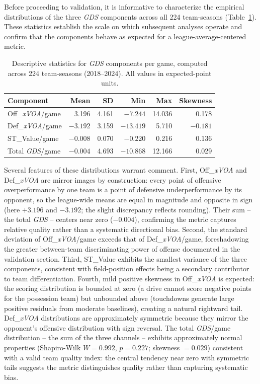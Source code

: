 \documentclass[12pt,a4paper]{article}
\newcommand{\xvoa}{\textit{xVOA}}
\newcommand{\gds}{\textit{GDS}}
\begin{document}
Before proceeding to validation, it is informative to characterize the empirical distributions of the three \gds{} components across all 224 team-seasons (Table~\ref{tab:descriptives}). These statistics establish the scale on which subsequent analyses operate and confirm that the components behave as expected for a league-average-centered metric.

\begin{table}[htbp]
  \centering
  \caption{Descriptive statistics for \gds{} components per game, computed across 224 team-seasons (2018--2024). All values in expected-point units.}
  \label{tab:descriptives}
  \small
  \begin{tabular}{lrrrrr}
    \toprule
    \textbf{Component} & \textbf{Mean} & \textbf{SD} & \textbf{Min} & \textbf{Max} & \textbf{Skewness} \\
    \midrule
    Off\_\xvoa{}/game  & 3.196 & 4.161 & $-7.244$ & 14.036 & 0.178 \\
    Def\_\xvoa{}/game  & $-3.192$ & 3.159 & $-13.419$ & 5.710 & $-0.181$ \\
    ST\_Value/game     & $-0.008$ & 0.070 & $-0.220$ & 0.216 & 0.136 \\
    Total \gds{}/game  & $-0.004$ & 4.693 & $-10.868$ & 12.166 & 0.029 \\
    \bottomrule
  \end{tabular}
\end{table}

Several features of these distributions warrant comment. First, Off\_\xvoa{} and Def\_\xvoa{} are mirror images by construction: every point of offensive overperformance by one team is a point of defensive underperformance by its opponent, so the league-wide means are equal in magnitude and opposite in sign (here $+3.196$ and $-3.192$; the slight discrepancy reflects rounding). Their sum -- the total \gds{} -- centers near zero ($-0.004$), confirming the metric captures relative quality rather than a systematic directional bias. Second, the standard deviation of Off\_\xvoa{}/game exceeds that of Def\_\xvoa{}/game, foreshadowing the greater between-team discriminating power of offense documented in the validation section. Third, ST\_Value exhibits the smallest variance of the three components, consistent with field-position effects being a secondary contributor to team differentiation. Fourth, mild positive skewness in Off\_\xvoa{} is expected: the scoring distribution is bounded at zero (a drive cannot score negative points for the possession team) but unbounded above (touchdowns generate large positive residuals from moderate baselines), creating a natural rightward tail. Def\_\xvoa{} distributions are approximately symmetric because they mirror the opponent's offensive distribution with sign reversal. The total \gds{}/game distribution -- the sum of the three channels -- exhibits approximately normal properties (Shapiro-Wilk $W = 0.992$, $p = 0.227$; skewness $= 0.029$) consistent with a valid team quality index: the central tendency near zero with symmetric tails suggests the metric distinguishes quality rather than capturing systematic bias.
\end{document}
